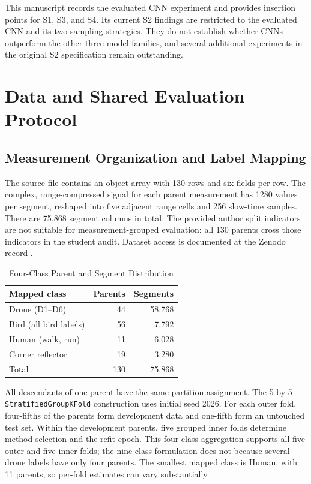 \IfFileExists{IEEEtran.cls}{\ieeetrue\documentclass[conference]{IEEEtran}}{\ieeefalse\documentclass[10pt,twocolumn,letterpaper]{article}}
\begin{document}
This manuscript records the evaluated CNN experiment and provides insertion points for S1, S3, and S4. Its current S2 findings are restricted to the evaluated CNN and its two sampling strategies. They do not establish whether CNNs outperform the other three model families, and several additional experiments in the original S2 specification remain outstanding.

\section{Data and Shared Evaluation Protocol}
\subsection{Measurement Organization and Label Mapping}
The source file contains an object array with 130 rows and six fields per row. The complex, range-compressed signal for each parent measurement has 1280 values per segment, reshaped into five adjacent range cells and 256 slow-time samples. There are 75,868 segment columns in total. The provided author split indicators are not suitable for measurement-grouped evaluation: all 130 parents cross those indicators in the student audit. Dataset access is documented at the Zenodo record \cite{dataset}.

\begin{table}[t]
\caption{Four-Class Parent and Segment Distribution}
\label{tab:dataset}
\centering
\small
\begin{tabular}{lrr}
\toprule
Mapped class & Parents & Segments \\
\midrule
Drone (D1--D6) & 44 & 58,768 \\
Bird (all bird labels) & 56 & 7,792 \\
Human (walk, run) & 11 & 6,028 \\
Corner reflector & 19 & 3,280 \\
\midrule
Total & 130 & 75,868 \\
\bottomrule
\end{tabular}
\end{table}

All descendants of one parent have the same partition assignment. The 5-by-5 \texttt{StratifiedGroupKFold} construction uses initial seed 2026. For each outer fold, four-fifths of the parents form development data and one-fifth form an untouched test set. Within the development parents, five grouped inner folds determine method selection and the refit epoch. This four-class aggregation supports all five outer and five inner folds; the nine-class formulation does not because several drone labels have only four parents. The smallest mapped class is Human, with 11 parents, so per-fold estimates can vary substantially.
\end{document}
